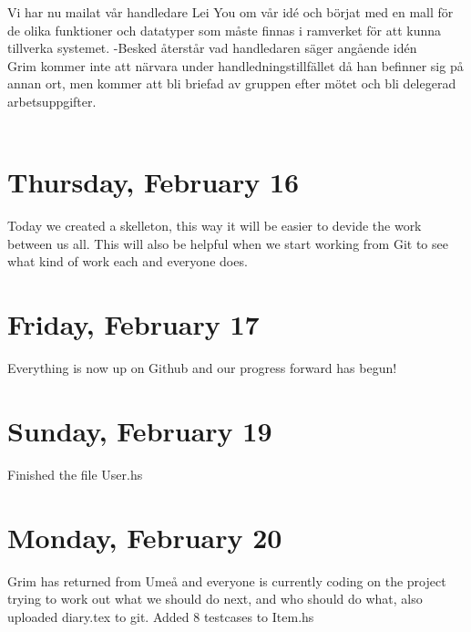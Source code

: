 \documentclass[11pt]{article}
\begin{document}
Vi har nu mailat vår handledare Lei You om vår idé och börjat med en mall för de olika funktioner och datatyper som måste finnas i ramverket för att kunna tillverka systemet.
-Besked återstår vad handledaren säger angående idén\\

Grim kommer inte att närvara under handledningstillfället då han befinner sig på annan ort, men kommer att bli briefad av gruppen efter mötet och bli delegerad arbetsuppgifter.\\\\
\section*{Thursday, February 16}
Today we created a skelleton, this way it will be easier to devide the work between us all. This will also be helpful when we start working from Git to see what kind of work each and everyone does.

\section*{Friday, February 17}
Everything is now up on Github and our progress forward has begun!
\section*{Sunday, February 19}
Finished the file User.hs
\section*{Monday, February 20}
Grim has returned from Umeå and everyone is currently coding on the project trying to work out what we should do next, and who should do what, also uploaded diary.tex to git. Added 8 testcases to Item.hs
\end{document}
